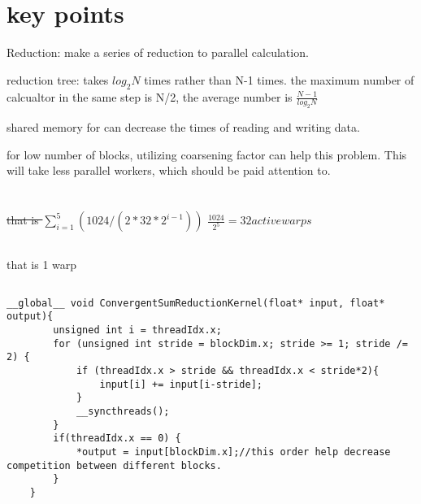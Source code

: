 \documentclass{article}
\begin{document}
\section*{key points}
Reduction: make a series of reduction to parallel calculation.

reduction tree: takes $log_{2}N$ times rather than N-1 times. the maximum number of calcualtor in the same step is N/2, the average number is \(\frac{N-1}{log_{2}N}\)

shared memory for can decrease the times of reading and writing data.

for low number of blocks, utilizing coarsening factor can help this problem. This will take less parallel workers, which should be paid attention to.

\section{}
\subsection{}
\sout{that is \(\sum_{i=1}^{5}(1024/(2*32*2^{i-1}))\)}
\(\frac{1024}{2^5} = 32 active warps\)

\subsection{}
that is 1 warp

\subsection{}
\begin{lstlisting}[basicstyle=\small\ttfamily, breaklines=true]
    __global__ void ConvergentSumReductionKernel(float* input, float* output){
        unsigned int i = threadIdx.x;
        for (unsigned int stride = blockDim.x; stride >= 1; stride /= 2) {
            if (threadIdx.x > stride && threadIdx.x < stride*2){
                input[i] += input[i-stride];
            }
            __syncthreads();
        }
        if(threadIdx.x == 0) {
            *output = input[blockDim.x];//this order help decrease competition between different blocks.
        }
    }
\end{lstlisting}
\end{document}
